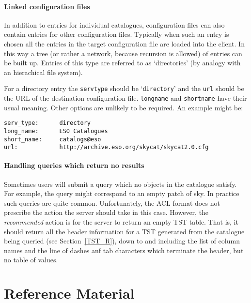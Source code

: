 \documentclass[twoside,11pt]{article}
\newcommand{\stardocinitials}  {SSN}
\newcommand{\stardocnumber}    {75.1}
\newcommand{\stardocname}{\stardocinitials /\stardocnumber}
\renewcommand{\_}{\texttt{\symbol{95}}}
\begin{document}
\subsection{Linked configuration files}

In addition to entries for individual catalogues, configuration files
can also contain entries for other configuration files.  Typically
when such an entry is chosen all the entries in the target configuration
file are loaded into the client.  In this way a tree (or rather a network,
because recursion is allowed) of entries can be built up.  Entries of
this type are referred to as `directories' (by analogy with an hierachical
file system).

For a directory entry the {\tt serv\_type} should be `{\tt directory}'
and the {\tt url} should be the URL of the destination configuration
file.  {\tt long\_name} and {\tt short\_name} have their usual meaning.
Other options are unlikely to be required.  An example might be:

\begin{verbatim}
serv_type:      directory
long_name:      ESO Catalogues
short_name:     catalogs@eso
url:            http://archive.eso.org/skycat/skycat2.0.cfg
\end{verbatim}

\subsection{Handling queries which return no results}

Sometimes users will submit a query which no objects in the catalogue
satisfy.  For example, the query might correspond to an empty patch of
sky.  In practice such queries are quite common.  Unfortunately, the ACL
format does not prescribe the action the server should take in this case.
However, the {\it recommended}\/ action is for the server to return an
empty TST table.  That is, it should return all the header information
for a TST generated from the catalogue being queried (see
Section~\ref{TST_R}), down to and including the list of column names
and the line of dashes anf tab characters which terminate the header,
but no table of values.


\cleardoublepage
\markboth{\stardocname}{\stardocname}
\part{Reference Material}
\end{document}
